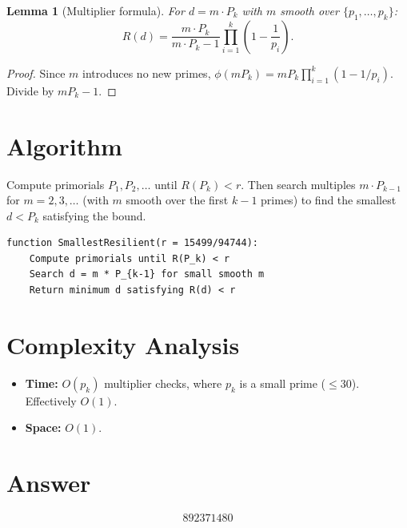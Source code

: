 \documentclass[12pt]{article}
\newtheorem{lemma}[theorem]{Lemma}
\begin{document}
\begin{lemma}[Multiplier formula]\label{lem:mult}
For $d=m\cdot P_k$ with $m$ smooth over $\{p_1,\ldots,p_k\}$:
\[
R(d)=\frac{m\cdot P_k}{m\cdot P_k-1}\prod_{i=1}^{k}\!\left(1-\frac{1}{p_i}\right).
\]
\end{lemma}

\begin{proof}
Since $m$ introduces no new primes, $\phi(mP_k)=mP_k\prod_{i=1}^k(1-1/p_i)$. Divide by $mP_k-1$.
\end{proof}

\section{Algorithm}

Compute primorials $P_1,P_2,\ldots$ until $R(P_k)<r$. Then search multiples $m\cdot P_{k-1}$ for $m=2,3,\ldots$ (with $m$ smooth over the first $k-1$ primes) to find the smallest $d<P_k$ satisfying the bound.

\begin{verbatim}
function SmallestResilient(r = 15499/94744):
    Compute primorials until R(P_k) < r
    Search d = m * P_{k-1} for small smooth m
    Return minimum d satisfying R(d) < r
\end{verbatim}

\section{Complexity Analysis}

\begin{itemize}
\item \textbf{Time:} $O(p_k)$ multiplier checks, where $p_k$ is a small prime ($\le 30$). Effectively $O(1)$.
\item \textbf{Space:} $O(1)$.
\end{itemize}

\section{Answer}

\[
\boxed{892371480}
\]
\end{document}
